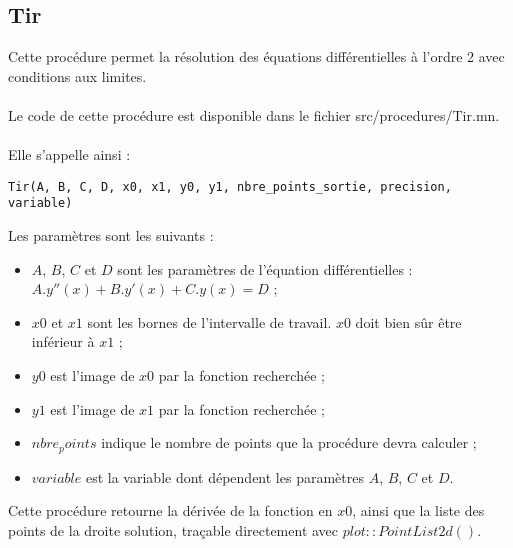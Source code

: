 \documentclass{report}
\begin{document}
\subsection{Tir}
Cette procédure permet la résolution des équations différentielles à l'ordre 2 avec conditions aux limites.
\\
\\
Le code de cette procédure est disponible dans le fichier src/procedures/Tir.mn.
\\
\\
Elle s'appelle ainsi :
\begin{verbatim}
Tir(A, B, C, D, x0, x1, y0, y1, nbre_points_sortie, precision, variable)
\end{verbatim}
Les paramètres sont les suivants : 
\begin{itemize}
	\item $A$, $B$, $C$ et $D$ sont les paramètres de l'équation différentielles : $A.y''(x) + B.y'(x) + C.y(x) = D$ ;
	\item $x0$ et $x1$ sont les bornes de l'intervalle de travail. $x0$ doit bien sûr être inférieur à $x1$ ;
	\item $y0$ est l'image de $x0$ par la fonction recherchée ;
	\item $y1$ est l'image de $x1$ par la fonction recherchée ;
	\item $nbre_points$ indique le nombre de points que la procédure devra calculer ;
	\item $variable$ est la variable dont dépendent les paramètres $A$, $B$, $C$ et $D$.
\end{itemize}

Cette procédure retourne la dérivée de la fonction en $x0$, ainsi que la liste des points de la droite solution, traçable directement avec $plot::PointList2d()$.
\end{document}
